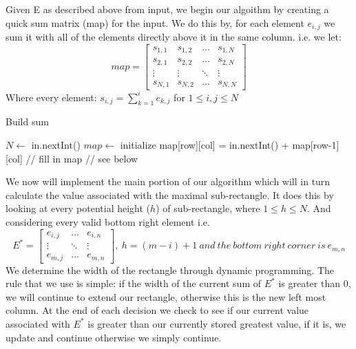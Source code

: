 \documentclass[12pt]{article}
\begin{document}
Given E as described above from input, we begin our algoithm by creating a quick
sum matrix (map) for the input. We do this by, for each element $e_{i,j}$ we sum it with
all of the elements directly above it in the same column. i.e. we let:
\[ map =
\begin{bmatrix}
    s_{1,1} & s_{1,2} & \dots  & s_{1,N} \\
    s_{2,1} & s_{2,2} & \dots  & s_{2,N} \\
    \vdots  & \vdots  & \ddots & \vdots  \\
    s_{N,1} & s_{N,2} & \dots  & s_{N,N}
\end{bmatrix}
\]
Where every element: $s_{i,j} = \sum\limits_{k=1}^{i} e_{k,j}$ for $1 \leq i,j \leq N$

\begin{algorithm}[H]
\caption{Build sum}
\begin{algorithmic}
        \State $N \gets$ in.nextInt()
        \State $map \gets$ initialize
                \State map[row][col] = in.nextInt() + map[row-1][col] // fill in map
            \EndFor
        \EndFor
        \State {} // see below
    \EndProcedure
\end{algorithmic}
\end{algorithm}

We now will implement the main portion of our algorithm which will in turn
calculate the value associated with the maximal sub-rectangle. It does this by looking
at every potential height ($h$) of sub-rectangle, where $1 \leq h \leq N$. And considering
every valid bottom right element i.e.
\[ E^{\ast} =
    \begin{bmatrix}
        e_{i,j}     & \dots  & e_{i,n}     \\
        \vdots      & \ddots & \vdots      \\
        e_{m,j}     & \dots  & e_{m,n}
    \end{bmatrix}
    ,\ h = (m-i)+1\ and\ the\ bottom\ right\ corner\ is\ e_{m,n}
\]
We determine the width of the rectangle through dynamic programming. The rule
that we use is simple: if the width of the current sum of $E^{\ast}$ is greater than 0, we will
continue to extend our rectangle, otherwise this is the new left most column. At the
end of each decision we check to see if our current value associated with $E^{\ast}$ is greater
than our currently stored greatest value, if it is, we update and continue otherwise
we simply continue.
\end{document}
